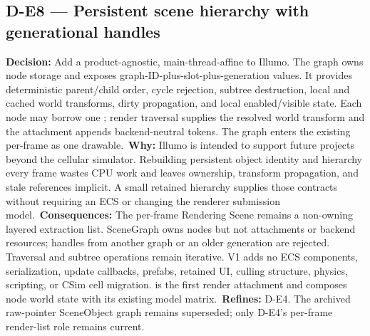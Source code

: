 \subsection*{D-E8 --- Persistent scene hierarchy with generational handles}
\begin{decisionbox}[title={D-E8 \quad 2026-08-19}]
\textbf{Decision:} Add a product-agnostic, main-thread-affine
 to Illumo. The graph owns node storage and exposes
graph-ID-plus-slot-plus-generation  values. It
provides deterministic parent/child order, cycle rejection, subtree
destruction, local and cached world transforms, dirty propagation, and local
enabled/visible state. Each node may borrow one
; render traversal supplies the resolved
world transform and the attachment appends backend-neutral tokens. The graph
enters the existing per-frame  as one drawable.\
\textbf{Why:} Illumo is intended to support future projects beyond the
cellular simulator. Rebuilding persistent object identity and hierarchy every
frame wastes CPU work and leaves ownership, transform propagation, and stale
references implicit. A small retained hierarchy supplies those contracts
without requiring an ECS or changing the renderer submission model.\
\textbf{Consequences:} The per-frame Rendering Scene remains a non-owning
layered extraction list. SceneGraph owns nodes but not attachments or backend
resources; handles from another graph or an older generation are rejected.
Traversal and subtree operations remain iterative. V1 adds no ECS components,
serialization, update callbacks, prefabs, retained UI, culling structure,
physics, scripting, or CSim cell migration. \symbolref{DebugDraw3D} is the
first render attachment and composes node world state with its existing model
matrix.\
\textbf{Refines:} D-E4. The archived raw-pointer SceneObject graph remains
superseded; only D-E4's per-frame render-list role remains current.
\end{decisionbox}

